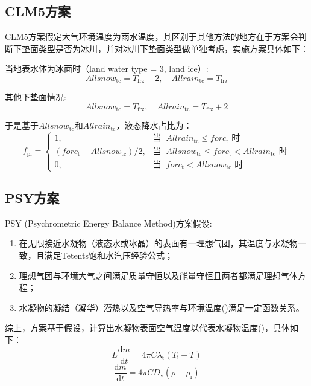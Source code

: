 \subsection{CLM5方案}
CLM5方案假定大气环境温度为雨水温度，其区别于其他方法的地方在于方案会判断下垫面类型是否为冰川，并对冰川下垫面类型做单独考虑，实施方案具体如下：

当地表水体为冰面时（land water type = 3, land ice）:
\begin{equation}
  Allsnow_{\mathrm{tc}} = T_{\mathrm{frz}} - 2,\quad Allrain_{\mathrm{tc}} = T_{\mathrm{frz}}
\end{equation}

其他下垫面情况:
\begin{equation}
  Allsnow_{\mathrm{tc}} = T_{\mathrm{frz}},\quad Allrain_{\mathrm{tc}} = T_{\mathrm{frz}} +2
\end{equation}

于是基于$Allsnow_{\mathrm{tc}}$和$Allrain_{\mathrm{tc}}$，液态降水占比为：
\begin{equation*}
  f_{\mathrm{pl}}= \begin{cases}
    1, & \text{当 }\ Allrain_{\mathrm{tc}}\leqslant forc_{\mathrm {t}} \text{ 时}\\
    (forc_{\mathrm {t}} - Allsnow_{\mathrm{tc}})/2, & \text{当 }\ Allsnow_{\mathrm{tc}}\leqslant forc_{\mathrm {t}} < Allrain_{\mathrm{tc}} \text{ 时} \\
    0, & \text{当 }\ forc_{\mathrm {t}} < Allsnow_{\mathrm{tc}} \text{ 时}
  \end{cases}
\end{equation*}


\subsection{PSY方案}
PSY (Psychrometric Energy Balance Method)方案假设:
\begin{enumerate}
  \item 在无限接近水凝物（液态水或冰晶）的表面有一理想气团，其温度与水凝物一致，且满足Tetents饱和水汽压经验公式；
  \item 理想气团与环境大气之间满足质量守恒以及能量守恒且两者都满足理想气体方程；
  \item 水凝物的凝结（凝华）潜热以及空气导热率与环境温度(\textcelsius)满足一定函数关系。
\end{enumerate}

综上，方案基于假设，计算出水凝物表面空气温度以代表水凝物温度(\textcelsius)，具体如下：
\begin{equation}
  L\frac{{\mathrm d} m}{{\mathrm d} t}=4\pi C\lambda_{\mathrm {t}}(T_{\mathrm {i}} - T)
\end{equation}
%
\begin{equation}
  \frac{{\mathrm d} m}{{\mathrm d} t}=4\pi CD_{\mathrm {v}}(\rho - \rho_{\mathrm {i}})
\end{equation}

